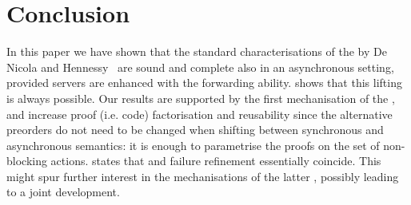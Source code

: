 \section{Conclusion}
\label{sec:conclusion}
\label{sec:discussion}

In this paper we have shown that the standard characterisations of
  the \mustpreorder by De Nicola and
  Hennessy~\cite{DBLP:journals/tcs/NicolaH84,DBLP:books/daglib/0066919}
  are sound and complete also in an asynchronous setting, provided servers are
  enhanced with the forwarding ability.
   shows that this lifting is always possible.
  Our results %
  are supported by %
  the first mechanisation of the \mustpreorder, and increase proof
  (i.e. code) factorisation and reusability since the alternative preorders
  do not need to be changed when shifting between synchronous and
  asynchronous semantics: it is enough to parametrise the proofs on
  the set of non-blocking actions.
%
%
%
   states that \mustpreorder and failure
  refinement essentially coincide. This might spur further interest in
  the mechanisations of the latter
  \cite{HOL-CSP-AFP,DBLP:journals/acta/BaxterRC22}, possibly leading
  to a joint development.%



